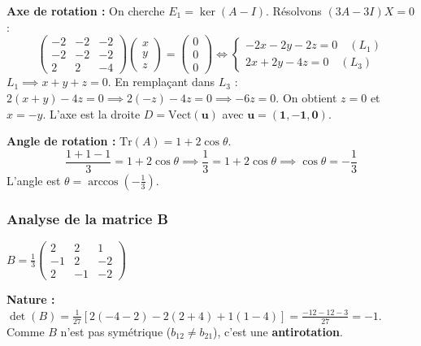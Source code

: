 \documentclass[french]{yLectureNote}
\begin{document}
     \textbf{Axe de rotation :} On cherche $E_1 = \ker(A-I)$. Résolvons $(3A-3I)X = 0$ :
    \[ \begin{pmatrix} -2 & -2 & -2 \\ -2 & -2 & -2 \\ 2 & 2 & -4 \end{pmatrix} \begin{pmatrix} x \\ y \\ z \end{pmatrix} = \begin{pmatrix} 0 \\ 0 \\ 0 \end{pmatrix} \iff 
    \begin{cases} -2x - 2y - 2z = 0 \quad (L_1) \\ 2x + 2y - 4z = 0 \quad (L_3) \end{cases} \]
    $L_1 \implies x + y + z = 0$. En remplaçant dans $L_3$ : $2(x+y) - 4z = 0 \implies 2(-z) - 4z = 0 \implies -6z = 0$.
    On obtient $z=0$ et $x = -y$. L'axe est la droite $D = \text{Vect}(\mathbf{u})$ avec $\mathbf{u = (1, -1, 0)}$.

    \textbf{Angle de rotation :} $\text{Tr}(A) = 1 + 2\cos\theta$.
    \[ \frac{1+1-1}{3} = 1 + 2\cos\theta \implies \frac{1}{3} = 1 + 2\cos\theta \implies \cos\theta = -\frac{1}{3} \]
    L'angle est $\theta = \arccos\left(-\frac{1}{3}\right)$.


\subsubsection{Analyse de la matrice B}
$B = \frac{1}{3} \begin{pmatrix} 2 & 2 & 1 \\ -1 & 2 & -2 \\ 2 & -1 & -2 \end{pmatrix}$


     \textbf{Nature :} $\det(B) = \frac{1}{27} [ 2(-4-2) - 2(2+4) + 1(1-4) ] = \frac{-12-12-3}{27} = -1$.
    Comme $B$ n'est pas symétrique ($b_{12} \neq b_{21}$), c'est une \textbf{antirotation}.
    
\end{document}
